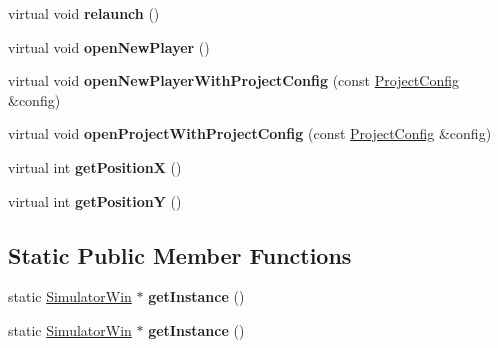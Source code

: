 \begin{DoxyCompactItemize}
\item 
\mbox{\label{classSimulatorWin_aebb57cf98ec61ae4e987a9bf41ccd3eb}} 
virtual void {\bfseries relaunch} ()
\item 
\mbox{\label{classSimulatorWin_a3672271c0c23894166b167de55f61cdd}} 
virtual void {\bfseries open\+New\+Player} ()
\item 
\mbox{\label{classSimulatorWin_ab50b02dd6345bc30147b8dc339d3cbf4}} 
virtual void {\bfseries open\+New\+Player\+With\+Project\+Config} (const \hyperlink{classProjectConfig}{Project\+Config} \&config)
\item 
\mbox{\label{classSimulatorWin_a6bec5b90895b8ff8015fe61eb4d98ffa}} 
virtual void {\bfseries open\+Project\+With\+Project\+Config} (const \hyperlink{classProjectConfig}{Project\+Config} \&config)
\item 
\mbox{\label{classSimulatorWin_a63433caedfd6772648c8b4698baa2b5c}} 
virtual int {\bfseries get\+PositionX} ()
\item 
\mbox{\label{classSimulatorWin_a10a05f2d92bc95c7c15cc478572ca572}} 
virtual int {\bfseries get\+PositionY} ()
\end{DoxyCompactItemize}
\subsection*{Static Public Member Functions}
\begin{DoxyCompactItemize}
\item 
\mbox{\label{classSimulatorWin_acaa3b6584c5aa26ce4395765c3940313}} 
static \hyperlink{classSimulatorWin}{Simulator\+Win} $\ast$ {\bfseries get\+Instance} ()
\item 
\mbox{\label{classSimulatorWin_a84953bff67d0de9166f1fdafc0a10ece}} 
static \hyperlink{classSimulatorWin}{Simulator\+Win} $\ast$ {\bfseries get\+Instance} ()
\end{DoxyCompactItemize}
